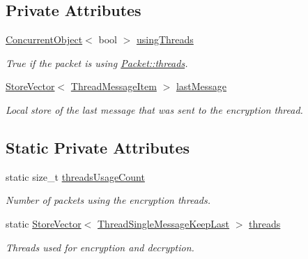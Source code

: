 \subsection*{Private Attributes}
\begin{DoxyCompactItemize}
\item 
\hypertarget{class_thread_single_message_keep_last_user_aa335a9224dec88435de543a0777eb7b2}{
\hyperlink{class_concurrent_object}{ConcurrentObject}$<$ bool $>$ \hyperlink{class_thread_single_message_keep_last_user_aa335a9224dec88435de543a0777eb7b2}{usingThreads}}
\label{class_thread_single_message_keep_last_user_aa335a9224dec88435de543a0777eb7b2}

\begin{DoxyCompactList}\small\item\em True if the packet is using \hyperlink{class_thread_single_message_keep_last_user_a63c547a8951cede4c6a9bbd69688980d}{Packet::threads}. \item\end{DoxyCompactList}\item 
\hyperlink{class_store_vector}{StoreVector}$<$ \hyperlink{class_thread_message_item}{ThreadMessageItem} $>$ \hyperlink{class_thread_single_message_keep_last_user_af278a99dd5a8994473021886b7ebf963}{lastMessage}
\begin{DoxyCompactList}\small\item\em Local store of the last message that was sent to the encryption thread. \item\end{DoxyCompactList}\end{DoxyCompactItemize}
\subsection*{Static Private Attributes}
\begin{DoxyCompactItemize}
\item 
static size\_\-t \hyperlink{class_thread_single_message_keep_last_user_a04ab8e3b67f4a9b995e2432e1462ce12}{threadsUsageCount}
\begin{DoxyCompactList}\small\item\em Number of packets using the encryption threads. \item\end{DoxyCompactList}\item 
\hypertarget{class_thread_single_message_keep_last_user_a63c547a8951cede4c6a9bbd69688980d}{
static \hyperlink{class_store_vector}{StoreVector}$<$ \hyperlink{class_thread_single_message_keep_last}{ThreadSingleMessageKeepLast} $>$ \hyperlink{class_thread_single_message_keep_last_user_a63c547a8951cede4c6a9bbd69688980d}{threads}}
\label{class_thread_single_message_keep_last_user_a63c547a8951cede4c6a9bbd69688980d}

\begin{DoxyCompactList}\small\item\em Threads used for encryption and decryption. \item\end{DoxyCompactList}\end{DoxyCompactItemize}


